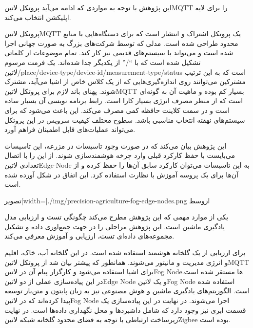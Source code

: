 این پژوهش با توجه به مواردی که ادامه می‌آید پروتکل ‌لاتین{MQTT} را برای لایه اپلیکشن انتخاب می‌کند.

 پروتکل ‌لاتین{MQTT} یک پروتکل اشتراک و انتشار است که برای دستگاه‌هایی با منابع محدود طراحی شده است. مدلی که توسط شرکت‌های بزرگ به صورت جهانی اجرا شده است
و می‌تواند با سیستم‌های قدیمی نیز کار کند.
 تمام موضوعات از کلماتی تشکیل شده است که با ``/'' از یکدیگر جدا شده‌اند.
یک فرمت مرسوم ‌لاتین{/place/device-type/device-id/measurement-type/status}
است که به این ترتیب مشترکین می‌توانند روی اندازه‌گیری‌هایی که از یک کلاس خاص از اشیا می‌آید، مشترک شوند.
 پهنای باند لازم برای پروتکل ‌لاتین{MQTT} بسیار کم بوده و ماهیت آن به گونه‌ای است که از منظر مصرف انرژی بسیار کارا است.
 رابط برنامه نویسی آن بسیار ساده است و در سمت کلاینت حافظه کمی مصرف می‌کند. این باعث می‌شود که برای سیستم‌های نهفته انتخاب مناسبی باشد.
 سطوح مختلف کیفیت سرویس در این پروتکل می‌تواند عملیات‌های قابل اطمینان فراهم آورد.

این پژوهش بیان می‌کند که در صورت وجود تاسیسات در مزرعه، این تاسیسات می‌بایست با حفظ کارکرد قبلی وارد چرخه هوشمند‌سازی شوند. از این را با اتصال تعدادی ‌لاتین{Edge-Node} به این تاسیسات می‌توان
کارکرد سابق آن‌ها را حفظ کرده و از آن‌ها برای یک پروسه آموزش با نظارت استفاده کرد. این اتفاق در شکل  آورده شده است.

‌تصویر[width=\textwidth]{./img/precision-agriculture-fog-edge-nodes.png}
‌ازوسط

یکی از موارد مهمی که این پژوهش مطرح می‌کند چگونگی تست و ارزیابی مدل یادگیری ماشین است. این پژوهش مراحلی را در جهت جمع‌اوری داده و تشکیل مجموعه‌های داده‌ای تست، ارزیابی و آموزش معرفی می‌کند.

برای ارزیابی از یک گلخانه هوشمند استفاده شده است. در این گلخانه آب، خاک، اقلیم و انرژی مدیریت و مانیتور می‌شوند. همانطور که پیشتر بیان شد از پروتکل ‌لاتین{MQTT} برای اشیا استفاده می‌شود و کارگزار پیام آن
در ‌لاتین{Fog Node}ها مستقر شده است. در این پیاده‌سازی عملی از دو ‌لاتین{Edge Node} و یک ‌لاتین{Fog Node} استفاده شده است. الگوریتم‌های یادگیری ماشین و هوش مصنوعی نیز به زبان پایتون و متن‌باز
توسعه پیدا کرده‌اند که در ‌لاتین{Fog Node} اجرا می‌شوند. در نهایت در این پیاده‌سازی یک قسمت ابری نیز وجود دارد که شامل داشبردها و محل نگهداری داده‌ها است. در نهایت زیرساخت ارتباطی با توجه به فضای محدود گلخانه شبکه
‌لاتین{Zigbee} بوده است.

